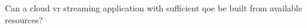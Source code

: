  Can a cloud \acrfull{vr} streaming application with sufficient \acrshort{qoe} be built from available resources?